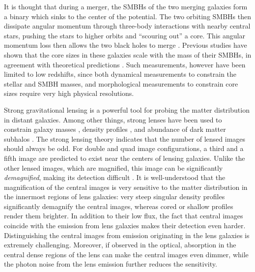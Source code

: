 \documentclass[chicago]{emulateapj}
\begin{document}
It is thought that during a merger, the SMBHs of the two merging galaxies form a binary which sinks to the center of the potential. The two orbiting SMBHs then dissipate angular momentum through three-body interactions with nearby central stars, pushing the stars to higher orbits and ``scouring out'' a core. This angular momentum loss then allows the two black holes to merge \citep{Begelman:80}.
Previous studies have shown that the core sizes in these galaxies scale with the mass of their SMBHs, in agreement with theoretical predictions \citep{Kormendy:09,Kormendy:13}.
Such measurements, however have been limited to low redshifts, since both dynamical measurements to constrain the stellar and SMBH masses, and morphological measurements to constrain core sizes require very high physical resolutions. 

Strong gravitational lensing is a powerful tool for probing the matter distribution in distant galaxies. Among other things, strong lenses have been used to constrain galaxy masses  \citep[e.g.][]{}, density profiles \citep[e.g.][]{}, and abundance of dark matter subhalos \citep[e.g.][]{}.
The strong lensing theory indicates that the number of lensed images should always be odd. For double and quad image configurations, a third and a fifth image are predicted to exist near the centers of lensing galaxies. Unlike the other lensed images, which are magnified, this image can be significantly \emph{demagnified}, making its detection difficult \citep{}.  It is well-understood that the magnification of the central images is very sensitive to the matter distribution in the innermost regions of lens galaxies: very steep singular density profiles significantly demagnify the central images, whereas cored or shallow profiles render them brighter. %
In addition to their low flux, the fact that central images coincide with the emission from lens galaxies makes their detection even harder. Distinguishing the central images from emission originating in the lens galaxies is extremely challenging.
Moreover, if observed in the optical, absorption in the central dense regions of the lens can make the central images even dimmer, while the photon noise from the lens emission further reduces the sensitivity. 
\end{document}
